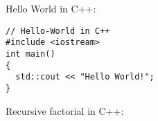 \documentclass[a4paper, 12pt]{article}
\begin{document}
Hello World in C++:
\begin{verbatim}
// Hello-World in C++
#include <iostream>
int main()
{
  std::cout << "Hello World!";
}
\end{verbatim}

Recursive factorial in C++:
\inputminted[firstline=3, 
             lastline=8, 
             linenos,
             breaklines]{cpp}{factorial.cpp}
\end{document}
